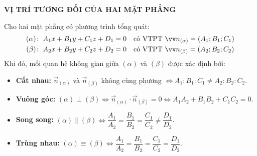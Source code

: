 \documentclass[12pt,a4paper]{article}
\begin{document}
\vspace{0.25cm}


\vspace{0.35cm}


\newpage


\begin{theorybox}
    \textbf{\textcolor{deepblue}{\faCompass\hskip 6pt VỊ TRÍ TƯƠNG ĐỐI CỦA HAI MẶT PHẲNG}}
    \par\vspace{3pt}
    Cho hai mặt phẳng có phương trình tổng quát:
    \[
        \begin{array}{r@{\;}l@{\quad}l}
            (\alpha)\colon & A_1x + B_1y + C_1z + D_1 = 0 & \text{có VTPT } \vec{n}_{(\alpha)} = (A_1; B_1; C_1) \\[3pt]
            (\beta)\colon  & A_2x + B_2y + C_2z + D_2 = 0 & \text{có VTPT } \vec{n}_{(\beta)} = (A_2; B_2; C_2)
        \end{array}
    \]
    Khi đó, mối quan hệ không gian giữa $(\alpha)$ và $(\beta)$ được xác định bởi:
    \begin{itemize}
        \item \textbf{Cắt nhau:} $\vec{n}_{(\alpha)}$ và $\vec{n}_{(\beta)}$ không cùng phương $\iff A_1 : B_1 : C_1 \neq A_2 : B_2 : C_2$.
        \item \textbf{Vuông góc:} $(\alpha) \perp (\beta) \iff \vec{n}_{(\alpha)} \cdot \vec{n}_{(\beta)} = 0 \iff A_1A_2 + B_1B_2 + C_1C_2 = 0$.
        \item \textbf{Song song:} $(\alpha) \parallel (\beta) \iff \dfrac{A_1}{A_2} = \dfrac{B_1}{B_2} = \dfrac{C_1}{C_2} \neq \dfrac{D_1}{D_2}$.
        \item \textbf{Trùng nhau:} $(\alpha) \equiv (\beta) \iff \dfrac{A_1}{A_2} = \dfrac{B_1}{B_2} = \dfrac{C_1}{C_2} = \dfrac{D_1}{D_2}$.
    \end{itemize}
\end{theorybox}
\end{document}
